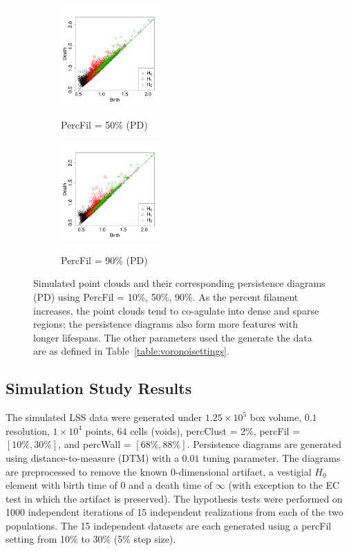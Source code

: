 \documentclass[12pt]{article}
\begin{document}
\begin{center}
\begin{figure}[htp!]
\begin{subfigure}{.25\textwidth}
      \label{fig:percfil01pd}
    \end{subfigure}
      \begin{subfigure}{.25\textwidth}
      \centering
      \caption{PercFil = 50\% (PD)}
      \includegraphics[height=1.5in]{figure_7_pd_0_5.pdf}
      \label{fig:percfil09pd}
    \end{subfigure}
      \begin{subfigure}{.25\textwidth}
      \centering
      \caption{PercFil = 90\% (PD)}
      \includegraphics[height=1.5in]{figure_7_pd_0_9.pdf}
      \label{fig:percfil09pd}
    \end{subfigure}
      \caption{Simulated point clouds and their corresponding persistence diagrams (PD) using PercFil = 10\%, 50\%, 90\%. As the percent filament increases, the point clouds tend to co-agulate into dense and sparse regions; the persistence diagrams also form more features with longer lifespans. The other parameters used the generate the data are as defined in Table~\ref{table:voronoisettings}.}
      \label{fig:percfilexample}
  \end{figure}
\end{center}

\subsection{Simulation Study Results}
\label{sec:results1}
The simulated LSS data were generated under $1.25 \times  10^{5}$ box volume, $0.1$ resolution, $1 \times  10^{4}$ points, $64$ cells (voids), percClust = 2\%,  percFil = $[10\%, 30\%]$, and percWall = $[68\%, 88\%]$. 
Persistence diagrams are generated using distance-to-measure (DTM) with a $0.01$ tuning parameter. The diagrams are preprocessed to remove the known 0-dimensional artifact, a vestigial $H_{0}$ element with birth time of 0 and a death time of $\infty$ (with exception to the EC test in which the artifact is preserved). The hypothesis tests were performed on 1000 independent iterations of 15 independent realizations from each of the two populations. The 15 independent datasets are each generated using a percFil setting from 10\% to 30\% (5\% step size).   
\end{document}
